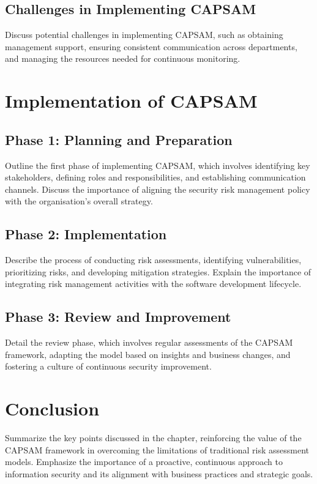     \subsection{Challenges in Implementing CAPSAM}
    Discuss potential challenges in implementing CAPSAM, such as obtaining management support, ensuring consistent communication across departments, and managing the resources needed for continuous monitoring.

\section{Implementation of CAPSAM}
    \subsection{Phase 1: Planning and Preparation}
    Outline the first phase of implementing CAPSAM, which involves identifying key stakeholders, defining roles and responsibilities, and establishing communication channels. Discuss the importance of aligning the security risk management policy with the organisation's overall strategy.

    \subsection{Phase 2: Implementation}
    Describe the process of conducting risk assessments, identifying vulnerabilities, prioritizing risks, and developing mitigation strategies. Explain the importance of integrating risk management activities with the software development lifecycle.

    \subsection{Phase 3: Review and Improvement}
    Detail the review phase, which involves regular assessments of the CAPSAM framework, adapting the model based on insights and business changes, and fostering a culture of continuous security improvement.

\section{Conclusion}
Summarize the key points discussed in the chapter, reinforcing the value of the CAPSAM framework in overcoming the limitations of traditional risk assessment models. Emphasize the importance of a proactive, continuous approach to information security and its alignment with business practices and strategic goals.